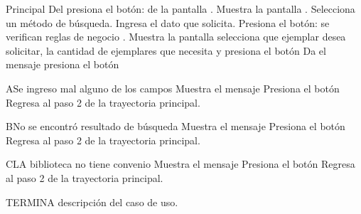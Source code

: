 	\begin{UCtrayectoria}{Principal}
		\UCpaso[\UCactor] Del  presiona el botón:   de la pantalla .
		\UCpaso[\UCsist]Muestra la pantalla .
		\UCpaso[\UCactor]Selecciona un método de búsqueda. 
		\UCpaso[\UCactor]Ingresa el dato que solicita.
		\UCpaso[\UCactor]Presiona el botón:  se verifican reglas de negocio    .
		\UCpaso[\UCsist] Muestra la pantalla 
		\UCpaso[\UCactor]selecciona que ejemplar desea solicitar, la cantidad de ejemplares que necesita y presiona el botón 
		\UCpaso[\UCsist] Da el mensaje 
		\UCpaso[\UCactor] presiona el botón 
	\end{UCtrayectoria}
		\begin{UCtrayectoriaA}{A}{Se ingreso mal alguno de los campos}
			\UCpaso[\UCsist] Muestra el mensaje 
			\UCpaso[\UCactor] Presiona el botón 
			\UCpaso[\UCsist] Regresa al paso 2 de la trayectoria principal.
		\end{UCtrayectoriaA}

		\begin{UCtrayectoriaA}{B}{No se encontró resultado de búsqueda}
			\UCpaso[\UCsist] Muestra el mensaje 
			\UCpaso[\UCactor] Presiona el botón 			
			\UCpaso[\UCsist] Regresa al paso 2 de la trayectoria principal.
		\end{UCtrayectoriaA}
		
		\begin{UCtrayectoriaA}{C}{LA biblioteca no tiene convenio}
			\UCpaso[\UCsist] Muestra el mensaje 
			\UCpaso[\UCactor] Presiona el botón 
			\UCpaso[\UCsist] Regresa al paso 2 de la trayectoria principal.
		\end{UCtrayectoriaA}
TERMINA descripción del caso de uso.
